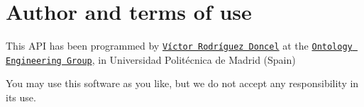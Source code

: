 \section*{Author and terms of use}

This A\-P\-I has been programmed by \href{http://purl.org/NET/vroddon}{\tt Víctor Rodríguez Doncel} at the \href{http://www.oeg-upm.net}{\tt Ontology Engineering Group}, in Universidad Politécnica de Madrid (Spain)

\begin{center}\end{center} 

You may use this software as you like, but we do not accept any responsibility in its use.
